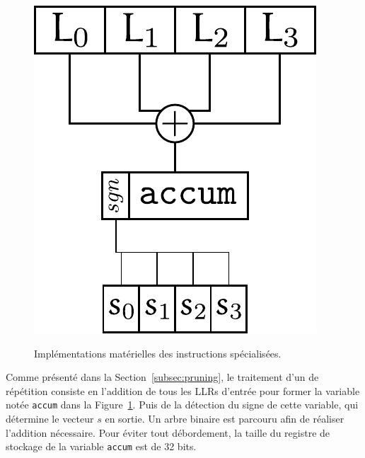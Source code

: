 \begin{figure}[t]
{  \includegraphics[scale=0.75]{main/ch3_fig/rep_tie}
  \label{fig:rep_tie}
  } \quad
  \caption{Implémentations matérielles des instructions spécialisées.}
\end{figure}

Comme présenté dans la Section~\ref{subsec:pruning}, le traitement d'un \noeud de répétition consiste en l'addition de tous les LLRs d'entrée pour former la variable notée \og \texttt{accum} \fg dans la Figure~\ref{fig:rep_tie}. Puis de la détection du signe de cette variable, qui détermine le vecteur $s$ en sortie. Un arbre binaire est parcouru afin de réaliser l'addition nécessaire. Pour éviter tout débordement, la taille du registre de stockage de la variable \texttt{accum} est de 32 bits.

